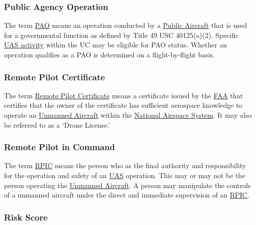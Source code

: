 \documentclass[
]{book}
\begin{document}
\hypertarget{PAO}{%
\subsubsection*{Public Agency Operation}\label{PAO}}

The term \protect\hyperlink{PAO}{PAO} means an operation conducted by a \protect\hyperlink{PA}{Public Aircraft} that is used for a governmental function as defined by Title 49 USC 40125(a)(2). Specific \protect\hyperlink{UASactivity}{UAS activity} within the UC may be eligible for PAO status. Whether an operation qualifies as a PAO is determined on a flight-by-flight basis.





\hypertarget{RPC}{%
\subsubsection*{Remote Pilot Certificate}\label{RPC}}

The term \protect\hyperlink{RPC}{Remote Pilot Certificate} means a certificate issued by the \protect\hyperlink{FAA}{FAA} that certifies that the owner of the certificate has sufficient aerospace knowledge to operate an \protect\hyperlink{UA}{Unmanned Aircraft} within the \protect\hyperlink{NAS}{National Airspace System}. It may also be referred to as a `Drone License.'



\hypertarget{RPIC}{%
\subsubsection*{Remote Pilot in Command}\label{RPIC}}

The term \protect\hyperlink{RPIC}{RPIC} means the person who as the final authority and responsibility for the operation and safety of an \protect\hyperlink{UAS}{UAS} operation. This may or may not be the person operating the \protect\hyperlink{UA}{Unmanned Aircraft}. A person may manipulate the controls of a unmanned aircraft under the direct and immediate supervision of an \protect\hyperlink{RPIC}{RPIC}.







\hypertarget{riskscore}{%
\subsubsection*{Risk Score}\label{riskscore}}
\end{document}
